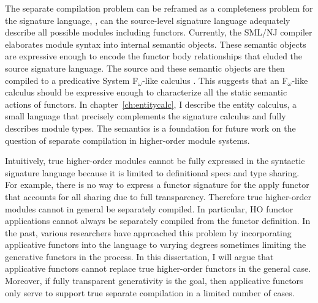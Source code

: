 		The separate compilation problem can be reframed as a completeness problem for the signature language, \ie, can the source-level signature language adequately describe all possible modules including functors. Currently, the SML/NJ compiler elaborates module syntax into internal semantic objects. These semantic objects are expressive enough to encode the functor body relationships that eluded the source signature language. The source and these semantic objects are then compiled to a predicative System F$_\omega$-like calculus \cite{shao98}. This suggests that an F$_\omega$-like calculus should be expressive enough to characterize all the static semantic actions of functors. In chapter~\ref{ch:entitycalc}, I describe the entity calculus, a small language that precisely complements the signature calculus and fully describes module types. The semantics is a foundation for future work on the question of separate compilation in higher-order module systems. 
		
		Intuitively, true higher-order modules cannot be fully expressed in the syntactic signature language because it is limited to definitional specs and type sharing. For example, there is no way to express a functor signature for the apply functor that accounts for all sharing due to full transparency. Therefore true higher-order modules cannot in general be separately compiled. In particular, HO functor applications cannot always be separately compiled from the functor definition. In the past, various researchers have approached this problem by incorporating applicative functors into the language to varying degrees \cite{leroy95,biswas95,russothesis,dhc03} sometimes limiting the generative functors in the process. In this dissertation, I will argue that applicative functors cannot replace true higher-order functors in the general case. Moreover, if fully transparent generativity is the goal, then applicative functors only serve to support true separate compilation in a limited number of cases. 
		
		
